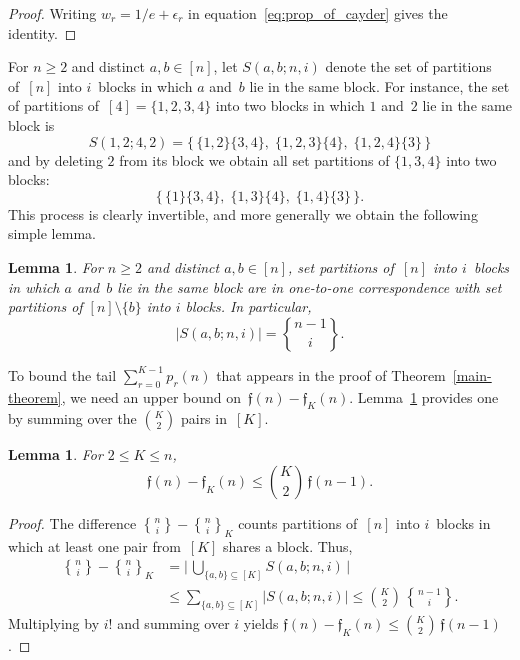 \documentclass[a4paper,11pt,UKenglish]{article}
\newcommand{\stirl}[3]{\genfrac{\{}{\}}{0pt}{}{{#1}}{{#2}}_{{#3}}}
\newcommand{\setstirling}[2]{%
  \genfrac{\{}{\}}{0pt}{}{{#1}}{{#2}}}
\newcommand{\fub}[1]{\mathfrak{f}(#1)}
\newcommand{\rfub}[2]{\mathfrak{f}_{#2}(#1)}
\newtheorem{lemma}[theorem]{Lemma}
\theoremstyle{definition}
\begin{document}
\begin{proof}
Writing $w_r = 1/e + \epsilon_r$ in
equation~\eqref{eq:prop_of_cayder} gives the identity.
\end{proof}

For $n \geq 2$ and distinct $a, b \in [n]$, let $S(a,b;n,i)$
denote the set of partitions of~$[n]$ into $i$~blocks in which
$a$ and~$b$ lie in the same block. For instance,
the set of partitions of~$[4]=\{1,2,3,4\}$ into two blocks
in which $1$ and~$2$ lie in the same block is
\[
  S(1,2;4,2)
  = \bigl\{\, \{1,2\}\{3,4\},\;
    \{1,2,3\}\{4\},\; \{1,2,4\}\{3\} \,\bigr\}
\]
and by deleting $2$ from its block we obtain all set partitions
of $\{1,3,4\}$ into two blocks:
\[
  \bigl\{\, \{1\}\{3,4\},\;
    \{1,3\}\{4\},\; \{1,4\}\{3\} \,\bigr\}.
\]
This process is clearly invertible, and more generally we obtain
the following simple lemma.

\begin{lemma}\label{lem:merge}
For $n \geq 2$ and distinct $a, b \in [n]$, set partitions
of~$[n]$ into $i$~blocks in which $a$ and~$b$ lie in the
same block are in one-to-one correspondence with set partitions
of $[n]\setminus\{b\}$ into $i$ blocks. In particular,
\[
  \bigl|S(a,b;n,i)\bigr| = \setstirling{n-1}{i}.
\]
\end{lemma}

To bound the tail $\sum_{r=0}^{K-1} p_r(n)$ that appears in
the proof of Theorem~\ref{main-theorem}, we need an upper bound
on~$\fub{n} - \rfub{n}{K}$.
Lemma~\ref{lem:merge} provides one by summing over the
$\binom{K}{2}$ pairs in~$[K]$.

\begin{lemma}\label{lem:union}
For $2 \leq K \leq n$,
\[
  \fub{n} - \rfub{n}{K} \leq \binom{K}{2}\, \fub{n-1}.
\]
\end{lemma}

\begin{proof}
The difference $\setstirling{n}{i} - \stirl{n}{i}{K}$ counts
partitions of~$[n]$ into $i$~blocks in which at least one pair
from~$[K]$ shares a block. Thus,
\begin{align*}
  \setstirling{n}{i} - \stirl{n}{i}{K}
  &= \Biggl|\,\bigcup_{\{a,b\} \subseteq [K]}S(a,b;n,i)\,\Biggr|\\[1ex]
  &\leq \sum_{\{a,b\} \subseteq [K]} |S(a,b;n,i)|
  \leq \binom{K}{2}\, \setstirling{n-1}{i}.
\end{align*}
Multiplying by $i!$ and summing over $i$ yields
$\fub{n} - \rfub{n}{K}
\leq \binom{K}{2}\, \fub{n-1}$.
\end{proof}
\end{document}
